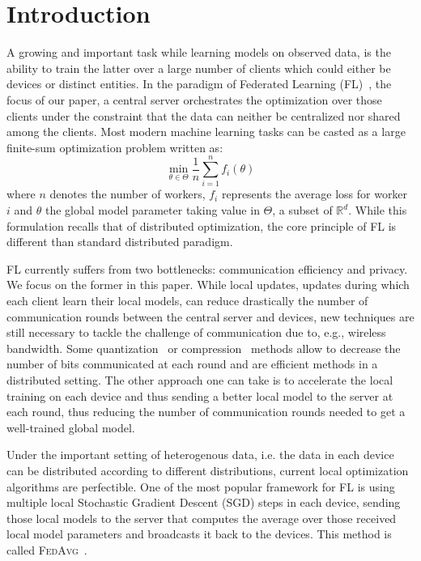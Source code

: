 \documentclass[11pt]{article}
\begin{document}
\vspace{-0.2in}
\section{Introduction}\label{sec:introduction}

A growing and important task while learning models on observed data, is the ability to train the latter over a large number of clients which could either be devices or distinct entities.
In the paradigm of Federated Learning (FL)~\citep{konevcny2016federated,mcmahan2017communication}, the focus of our paper, a central server orchestrates the optimization over those clients under the constraint that the data can neither be centralized nor shared among the clients.
Most modern machine learning tasks can be casted as a large finite-sum optimization problem written as:
\begin{equation}\label{eq:opt}
\min \limits_{\theta \in \Theta} \frac{1}{n} \sum_{i=1}^n f_i(\theta)
\end{equation}
where $n$ denotes the number of workers, $f_i$ represents the average loss for worker $i$ and $\theta$ the global model parameter taking value in $\Theta$, a subset of $\mathbb{R}^d$.
While this formulation recalls that of distributed optimization, the core principle of FL is different than standard distributed paradigm.

FL currently suffers from two bottlenecks: communication efficiency and privacy.
We focus on the former in this paper.
While local updates, updates during which each client learn their local models, can reduce drastically the number of communication rounds between the central server and devices, new techniques are still necessary to tackle the  challenge of communication due to, e.g., wireless bandwidth.
Some quantization~\citep{alistarh2017qsgd, wangni2018gradient} or compression~\citep{lin2017deep} methods allow to decrease the number of bits communicated at each round and are efficient methods in a distributed setting.
The other approach one can take is to accelerate the local training on each device and thus sending a better local model to the server at each round, thus reducing the number of communication rounds needed to get a well-trained global model.

Under the important setting of heterogenous data, i.e. the data in each device can be distributed according to different distributions, current local optimization algorithms are perfectible.
One of the most popular framework for FL is using multiple local Stochastic Gradient Descent (\textsc{SGD}) steps in each device, sending those local models to the server that computes the average over those received local model parameters and broadcasts it back to the devices. This method is called \textsc{FedAvg}~\citep{mcmahan2017communication}.
\end{document}

